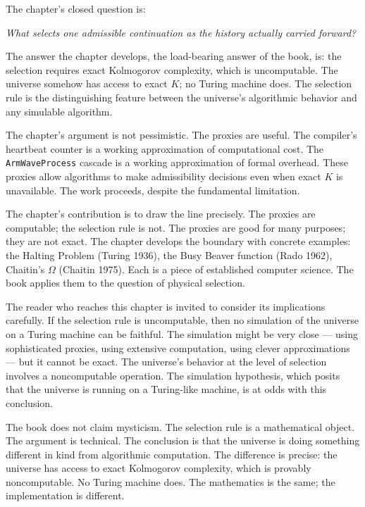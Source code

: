 \begin{chapteressay}
The chapter's closed question is:

\begin{center}
\emph{What selects one admissible continuation as the history
actually carried forward?}
\end{center}

The answer the chapter develops, the load-bearing answer of the
book, is: the selection requires exact Kolmogorov complexity,
which is uncomputable. The universe somehow has access to
exact $K$; no Turing machine does. The selection rule is the
distinguishing feature between the universe's algorithmic
behavior and any simulable algorithm.

The chapter's argument is not pessimistic. The proxies are
useful. The compiler's heartbeat counter is a working
approximation of computational cost. The \texttt{ArmWaveProcess}
cascade is a working approximation of formal overhead. These
proxies allow algorithms to make admissibility decisions even
when exact $K$ is unavailable. The work proceeds, despite the
fundamental limitation.

The chapter's contribution is to draw the line precisely. The
proxies are computable; the selection rule is not. The proxies
are good for many purposes; they are not exact. The chapter
develops the boundary with concrete examples: the Halting
Problem (Turing 1936), the Busy Beaver function (Rado 1962),
Chaitin's $\Omega$ (Chaitin 1975). Each is a piece of established
computer science. The book applies them to the question of
physical selection.

The reader who reaches this chapter is invited to consider its
implications carefully. If the selection rule is uncomputable,
then no simulation of the universe on a Turing machine can be
faithful. The simulation might be very close --- using
sophisticated proxies, using extensive computation, using
clever approximations --- but it cannot be exact. The universe's
behavior at the level of selection involves a noncomputable
operation. The simulation hypothesis, which posits that the
universe is running on a Turing-like machine, is at odds with
this conclusion.

The book does not claim mysticism. The selection rule is a
mathematical object. The argument is technical. The
conclusion is that the universe is doing something different in
kind from algorithmic computation. The difference is precise:
the universe has access to exact Kolmogorov complexity, which is
provably noncomputable. No Turing machine does. The mathematics
is the same; the implementation is different.

\end{chapteressay}

